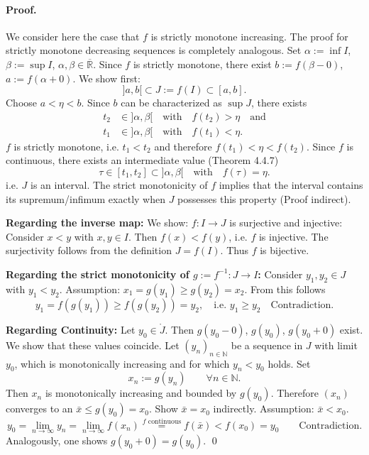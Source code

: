 \documentclass[12pt]{article}
\newcommand{\N}{\mathbb{N}}
\newcommand{\R}{\mathbb{R}}
\begin{document}
\paragraph{Proof.} We consider here the case that $f$ is strictly monotone increasing. The proof for strictly monotone decreasing sequences is completely analogous.
Set $\alpha := \inf I$, $\beta := \sup I$, $\alpha, \beta \in \overline{\R}$. Since $f$ is strictly monotone, there exist $b := f(\beta - 0)$, $a := f(\alpha + 0)$. We show first:
\[
	]a, b[ \subset J := f(I) \subset [a, b].
\]
Choose $a < \eta < b$. Since $b$ can be characterized as $\sup J$, there exists
\begin{align*}
	t_2 &\in ]\alpha, \beta[ \quad \text{with} \quad f(t_2) > \eta \quad \text{and} \\
	t_1 &\in ]\alpha, \beta[ \quad \text{with} \quad f(t_1) < \eta.
\end{align*}
$f$ is strictly monotone, i.e. $t_1 < t_2$ and therefore $f(t_1) < \eta < f(t_2)$. Since $f$ is continuous, there exists an intermediate value (Theorem 4.4.7)
\[
	\tau \in [t_1, t_2] \subset ]\alpha, \beta[ \quad \text{with} \quad f(\tau) = \eta.
\]
i.e. $J$ is an interval.
The strict monotonicity of $f$ implies that the interval contains its supremum/infimum exactly when $J$ possesses this property (Proof indirect).

\textbf{Regarding the inverse map:}
We show: $f: I \to J$ is surjective and injective: Consider $x < y$ with $x, y \in I$. Then $f(x) < f(y)$, i.e. $f$ is injective. The surjectivity follows from the definition $J = f(I)$. Thus $f$ is bijective.

\textbf{Regarding the strict monotonicity of $g := f^{-1}: J \to I$:}
Consider $y_1, y_2 \in J$ with $y_1 < y_2$. Assumption: $x_1 = g(y_1) \ge g(y_2) = x_2$. From this follows
\[
	y_1 = f(g(y_1)) \ge f(g(y_2)) = y_2, \quad \text{i.e. } y_1 \ge y_2 \quad \text{Contradiction.}
\]

\textbf{Regarding Continuity:}
Let $y_0 \in \mathring{J}$. Then $g(y_0 - 0)$, $g(y_0)$, $g(y_0 + 0)$ exist. We show that these values coincide. Let $(y_n)_{n\in\N}$ be a sequence in $J$ with limit $y_0$, which is monotonically increasing and for which $y_n < y_0$ holds. Set
\[
    x_n := g(y_n) \qquad \forall n \in \N.
\]
Then $x_n$ is monotonically increasing and bounded by $g(y_0)$. Therefore $(x_n)$ converges to an $\bar{x} \leq g(y_0) = x_0$. Show $\bar{x} = x_0$ indirectly. Assumption: $\bar{x} < x_0$.
\[
    y_0 = \lim_{n\to\infty} y_n = \lim_{n\to\infty} f(x_n) \overset{f \text{ continuous}}{=} f(\bar{x}) < f(x_0) = y_0 \qquad \text{Contradiction.}
\]
Analogously, one shows $g(y_0 + 0) = g(y_0)$.
\qed
\end{document}
